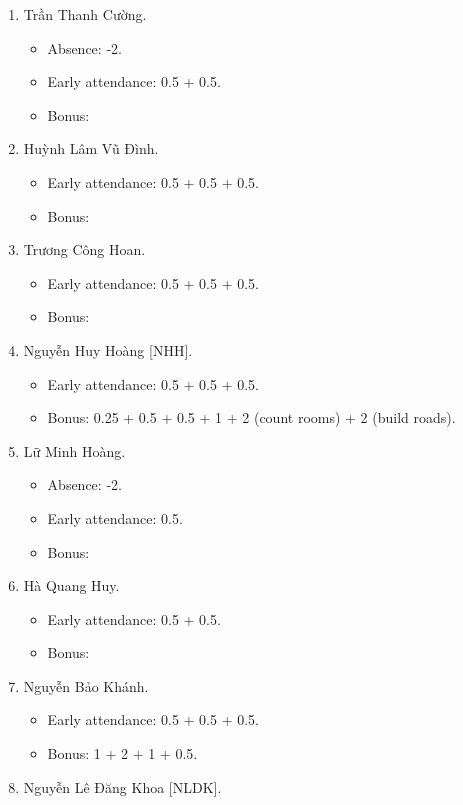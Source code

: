 \documentclass{article}
\begin{document}
\begin{enumerate}
	\item {\sc Trần Thanh Cường.}
	\begin{itemize}
		\item Absence: -2.
		\item Early attendance: 0.5 + 0.5.
		\item Bonus: 
	\end{itemize}
	\item {\sc Huỳnh Lâm Vũ Đình.}
	\begin{itemize}
		\item Early attendance: 0.5 + 0.5 + 0.5.
		\item Bonus: 
	\end{itemize}
	\item {\sc Trương Công Hoan.}
	\begin{itemize}
		\item Early attendance: 0.5 + 0.5 + 0.5.
		\item Bonus: 
	\end{itemize}
	\item {\sc Nguyễn Huy Hoàng [NHH].}
	\begin{itemize}
		\item Early attendance: 0.5 + 0.5 + 0.5.
		\item Bonus: 0.25 + 0.5 + 0.5 + 1 + 2 (count rooms) + 2 (build roads).
	\end{itemize}
	\item {\sc Lữ Minh Hoàng.}
	\begin{itemize}
		\item Absence: -2.
		\item Early attendance: 0.5.
		\item Bonus: 
	\end{itemize}
	\item {\sc Hà Quang Huy.}
	\begin{itemize}
		\item Early attendance: 0.5 + 0.5.
		\item Bonus: 
	\end{itemize}
	\item {\sc Nguyễn Bảo Khánh.}
	\begin{itemize}
		\item Early attendance: 0.5 + 0.5 + 0.5.
		\item Bonus: 1 + 2 + 1 + 0.5.
	\end{itemize}
	\item {\sc Nguyễn Lê Đăng Khoa [NLDK].}
	\begin{itemize}

\end{itemize}
\end{enumerate}
\end{document}
